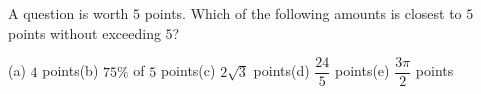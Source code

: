 A question is worth $5$ points. Which of the following amounts is closest to $5$ points without exceeding $5$?

(a) $4$ points\quad (b) $75\%$ of $5$ points\quad (c) $2\sqrt3$ points\quad (d) $\dfrac{24}{5}$ points\quad (e) $\dfrac{3\pi}{2}$ points
